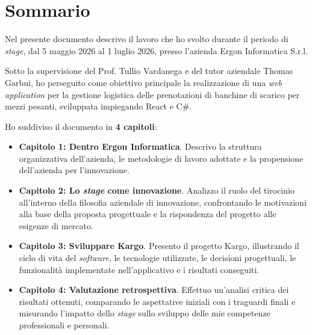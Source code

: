 \cleardoublepage
{}
{}
\begingroup
\let\clearpage\relax
\let\cleardoublepage\relax
\chapter*{Sommario}
Nel presente documento descrivo il lavoro che ho svolto durante il periodo di \textit{stage}, dal 5 maggio 2026 al 1 luglio 2026, presso l'azienda Ergon Informatica S.r.l.

\noindent
Sotto la supervisione del Prof. Tullio Vardanega e del tutor aziendale Thomas Garbui, ho perseguito come obiettivo principale la realizzazione di una \textit{web application} per la gestione logistica delle prenotazioni di banchine di scarico per mezzi pesanti, sviluppata impiegando React e C\#.

\noindent
Ho suddiviso il documento in \textbf{4 capitoli}:
\begin{itemize}
    \item \textbf{Capitolo 1: Dentro Ergon Informatica}. Descrivo la struttura organizzativa dell'azienda, le metodologie di lavoro adottate e la propensione dell’azienda per l’innovazione.
    \item \textbf{Capitolo 2: Lo \textit{stage} come innovazione}. Analizzo il ruolo del tirocinio all'interno della filosofia aziendale di innovazione, confrontando le motivazioni alla base della proposta progettuale e la rispondenza del progetto alle esigenze di mercato.
    \item \textbf{Capitolo 3: Sviluppare Kargo}. Presento il progetto Kargo, illustrando il ciclo di vita del \textit{software}, le tecnologie utilizzate, le decisioni progettuali, le funzionalità implementate nell'applicativo e i risultati conseguiti.
    \item \textbf{Capitolo 4: Valutazione retrospettiva}. Effettuo un'analisi critica dei risultati ottenuti, comparando le aspettative iniziali con i traguardi finali e misurando l'impatto dello \textit{stage} sullo sviluppo delle mie competenze professionali e personali.
\end{itemize}
\newpage
